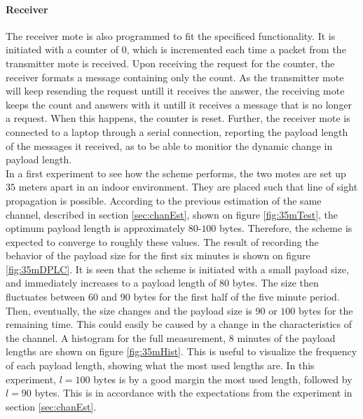 \paragraph{Receiver} The receiver mote is also programmed to fit the specificed functionality. It is initiated with a counter of $0$, which is incremented each time a packet from the transmitter mote is received. Upon receiving the request for the counter, the receiver formats a message containing only the count. As the transmitter mote will keep resending the request untill it receives the answer, the receiving mote keeps the count and answers with it untill it receives a message that is no longer a request. When this happens, the counter is reset. Further, the receiver mote is connected to a laptop through a serial connection, reporting the payload length of the messages it received, as to be able to monitior the dynamic change in payload length.
\\[8pt]
In a first experiment to see how the scheme performs, the two motes are set up $35$ meters apart in an indoor environment. They are placed such that line of sight propagation is possible. According to the previous estimation of the same channel, described in section \ref{sec:chanEst}, shown on figure \ref{fig:35mTest}, the optimum payload length is approximately $80$-$100$ bytes. Therefore, the scheme is expected to converge to roughly these values. 
The result of recording the behavior of the payload size for the first six minutes is shown on figure \ref{fig:35mDPLC}. It is seen that the scheme is initiated with a small payload size, and immediately increases to a payload length of $80$ bytes. The size then fluctuates between $60$ and $90$ bytes for the first half of the five minute period. Then, eventually, the size changes and the payload size is $90$ or $100$ bytes for the remaining time. This could easily be caused by a change in the characteristics of the channel. A histogram for the full measurement, $8$ minutes of the payload lengths are shown on figure \ref{fig:35mHist}. This is useful to visualize the frequency of each payload length, showing what the most used lengths are. In this experiment, $l=100$ bytes is by a good margin the most used length, followed by $l=90$ bytes. This is in accordance with the expectations from the experiment in section \ref{sec:chanEst}.
\\[8pt]
